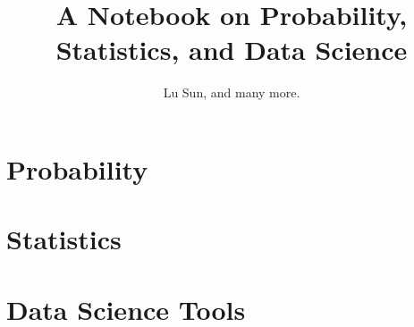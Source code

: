 



\makeindex



\frontmatter

\title{A Notebook on Probability, Statistics, and Data Science}
\author{Lu Sun, and many more.}

\maketitle


\tableofcontents


\listoffigures
\listoftables

\mainmatter

\part{Probability}







\part{Statistics}












\part{Data Science Tools}


















\printindex


